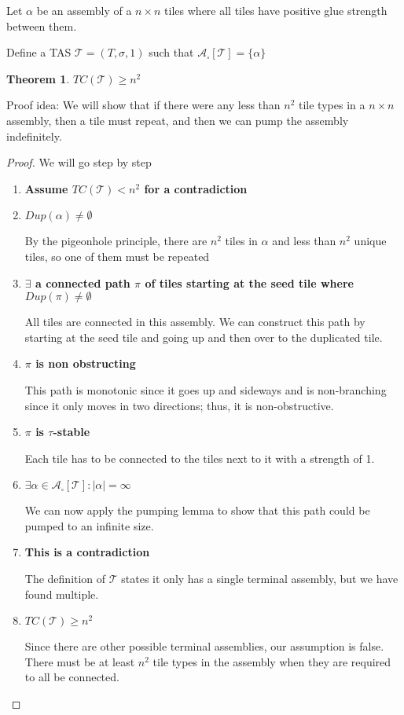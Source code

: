 \documentclass[12pt]{article}
\newtheorem{theorem}{Theorem}
\begin{document}
Let $\alpha$ be an assembly of a $n \times n$ tiles where all tiles have positive glue strength between them.

Define a TAS $\mathcal{T} = (T, \sigma, 1)$ such that $\mathcal{A}_\square[\mathcal{T}] = \{ \alpha \}$


\begin{theorem}
	$TC(\mathcal{T}) \geq n^2$
\end{theorem}

Proof idea: We will show that if there were any less than $n^2$ tile types in a $n \times n$ assembly, then a tile must repeat, and then we can pump the assembly indefinitely.

\begin{proof}
	We will go step by step
	\begin{enumerate}
		\item \textbf{Assume $TC(\mathcal{T}) < n^2$ for a contradiction}

		\item \textbf{$Dup(\alpha) \neq \emptyset$}

		By the pigeonhole principle, there are $n^2$ tiles in $\alpha$ and less than $n^2$ unique tiles, so one of them must be repeated

		\item \textbf{$\exists$ a connected path $\pi$ of tiles starting at the seed tile where $Dup(\pi) \neq \emptyset$}

		All tiles are connected in this assembly. We can construct this path by starting at the seed tile and going up and then over to the duplicated tile. 

		\item \textbf{$\pi$ is non obstructing}

        This path is monotonic since it goes up and sideways and is non-branching since it only moves in two directions; thus, it is non-obstructive. 

        \item \textbf{$\pi$ is $\tau$-stable}

            Each tile has to be connected to the tiles next to it with a strength of 1.

        \item \textbf{$\exists \alpha \in \mathcal{A}_\square[\mathcal{T}] : |\alpha| = \infty $}

        We can now apply the pumping lemma to show that this path could be pumped to an infinite size.

        \item \textbf{This is a contradiction}

        The definition of $\mathcal{T}$ states it only has a single terminal assembly, but we have found multiple.

		\item \textbf{$TC(\mathcal{T}) \geq n^2$}

            Since there are other possible terminal assemblies, our assumption is false. There must be at least $n^2$ tile types in the assembly when they are required to all be connected. 


	\end{enumerate}
\end{proof}
\end{document}
